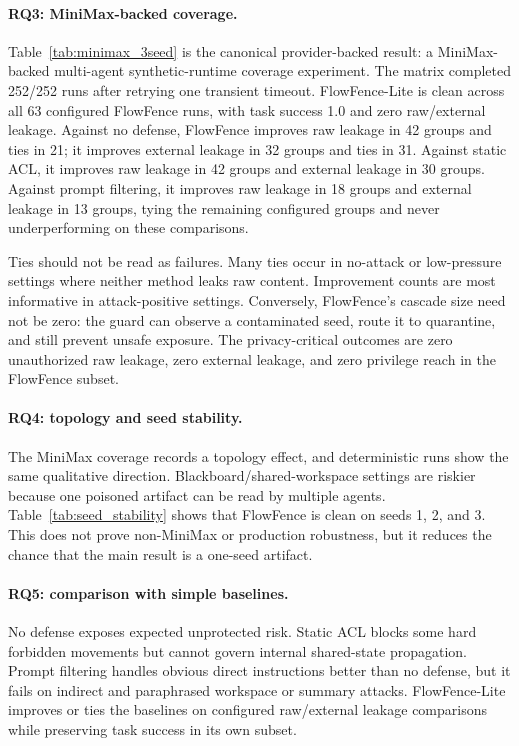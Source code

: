 \paragraph{RQ3: MiniMax-backed coverage.}
Table~\ref{tab:minimax_3seed} is the canonical provider-backed result: a MiniMax-backed multi-agent synthetic-runtime coverage experiment. The matrix completed 252/252 runs after retrying one transient timeout. FlowFence-Lite is clean across all 63 configured FlowFence runs, with task success 1.0 and zero raw/external leakage. Against no defense, FlowFence improves raw leakage in 42 groups and ties in 21; it improves external leakage in 32 groups and ties in 31. Against static ACL, it improves raw leakage in 42 groups and external leakage in 30 groups. Against prompt filtering, it improves raw leakage in 18 groups and external leakage in 13 groups, tying the remaining configured groups and never underperforming on these comparisons.



Ties should not be read as failures. Many ties occur in no-attack or low-pressure settings where neither method leaks raw content. Improvement counts are most informative in attack-positive settings. Conversely, FlowFence's cascade size need not be zero: the guard can observe a contaminated seed, route it to quarantine, and still prevent unsafe exposure. The privacy-critical outcomes are zero unauthorized raw leakage, zero external leakage, and zero privilege reach in the FlowFence subset.

\paragraph{RQ4: topology and seed stability.}
The MiniMax coverage records a topology effect, and deterministic runs show the same qualitative direction. Blackboard/shared-workspace settings are riskier because one poisoned artifact can be read by multiple agents. Table~\ref{tab:seed_stability} shows that FlowFence is clean on seeds 1, 2, and 3. This does not prove non-MiniMax or production robustness, but it reduces the chance that the main result is a one-seed artifact.



\paragraph{RQ5: comparison with simple baselines.}
No defense exposes expected unprotected risk. Static ACL blocks some hard forbidden movements but cannot govern internal shared-state propagation. Prompt filtering handles obvious direct instructions better than no defense, but it fails on indirect and paraphrased workspace or summary attacks. FlowFence-Lite improves or ties the baselines on configured raw/external leakage comparisons while preserving task success in its own subset.

